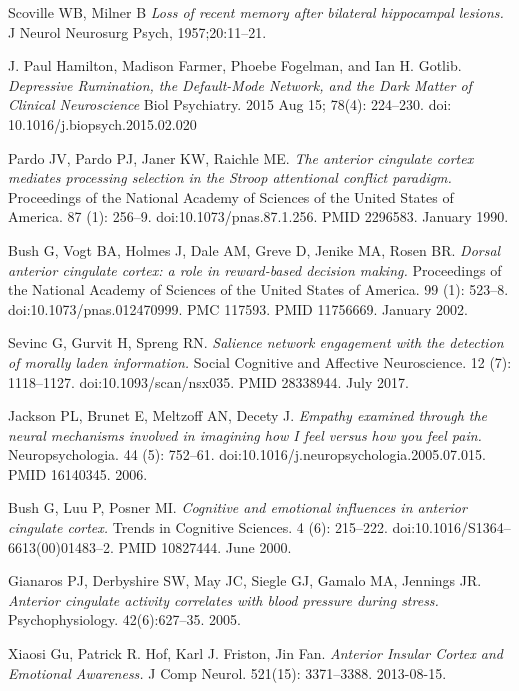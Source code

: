 \documentclass[a4paper, amsfonts, amssymb, amsmath, reprint, showkeys, nofootinbib, twoside]{revtex4-1}
\begin{document}
\begin{thebibliography}{99}
 Scoville WB, Milner B
 \textit{Loss of recent memory after bilateral hippocampal lesions.}
 J Neurol Neurosurg Psych,  1957;20:11–21.

  J. Paul Hamilton, Madison Farmer, Phoebe Fogelman, and Ian H. Gotlib.
  \textit{Depressive Rumination, the Default-Mode Network,
          and the Dark Matter of Clinical Neuroscience}
  Biol Psychiatry. 2015 Aug 15; 78(4): 224–230. doi: 10.1016/j.biopsych.2015.02.020

  Pardo JV, Pardo PJ, Janer KW, Raichle ME.
  \textit{The anterior cingulate cortex mediates processing selection in the Stroop
    attentional conflict paradigm.}
  Proceedings of the National Academy of Sciences of the United States of
  America. 87 (1): 256–9. doi:10.1073/pnas.87.1.256. PMID 2296583. January 1990.

  Bush G, Vogt BA, Holmes J, Dale AM, Greve D, Jenike MA, Rosen BR.
  \textit{Dorsal anterior cingulate cortex: a role in reward-based decision making.}
  Proceedings of the National Academy of Sciences of the United States of
  America. 99 (1): 523–8. doi:10.1073/pnas.012470999. PMC 117593. PMID
  11756669. January 2002.

  Sevinc G, Gurvit H, Spreng RN.
  \textit{Salience network engagement with the detection of morally laden
    information.}
  Social Cognitive and Affective Neuroscience. 12 (7):
  1118–1127. doi:10.1093/scan/nsx035. PMID 28338944. July 2017.

  Jackson PL, Brunet E, Meltzoff AN, Decety J.
  \textit{Empathy examined through the neural mechanisms involved in imagining how I
    feel versus how you feel pain.}
  Neuropsychologia. 44 (5): 752–61. doi:10.1016/j.neuropsychologia.2005.07.015. PMID
  16140345. 2006.

  Bush G, Luu P, Posner MI.
  \textit{Cognitive and emotional influences in anterior cingulate cortex.}
  Trends in Cognitive Sciences. 4 (6):
  215–222. doi:10.1016/S1364–6613(00)01483–2. PMID 10827444. June 2000.

  Gianaros PJ, Derbyshire SW, May JC, Siegle GJ, Gamalo MA, Jennings JR.
  \textit{Anterior cingulate activity correlates with blood pressure during
    stress.}
  Psychophysiology. 42(6):627–35. 2005.

  Xiaosi Gu, Patrick R. Hof, Karl J. Friston, Jin Fan.
  \textit{Anterior Insular Cortex and Emotional Awareness.}
  J Comp Neurol. 521(15): 3371–3388. 2013-08-15.


\end{thebibliography}
\end{document}
